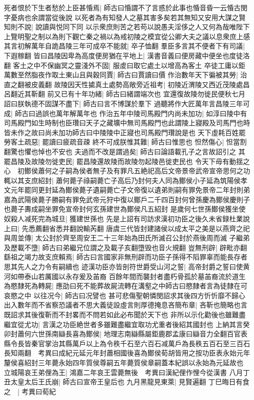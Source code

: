 死者恨於下生者愁於上臣甚惛焉|{
	師古曰惛謂不了言惑於此事也惛音昏一云惛古閔字憂病也余謂當從後說}
以死者為有知發人之墓其害多矣若其無知又安用大謀之賢知則不說|{
	說讀與悦同下同}
以示衆庶則苦之若苟以說愚夫淫侈之人又何為哉唯陛下上覽明聖之制以為則下觀亡秦之禍以為戒初陵之模宜從公卿大夫之議以息衆庶上感其言初解萬年自詭昌陵三年可成卒不能就|{
	卒子恤翻}
羣臣多言其不便者下有司議|{
	下遐稼翻}
皆曰昌陵因卑為高度便房猶在平地上|{
	漢書音義曰便房藏中便坐也度徒洛翻}
客土之中不保幽冥之靈淺外不固|{
	服䖍曰取它處土以增高為客土}
卒徒工庸以鉅萬數至然脂夜作取土東山且與穀同賈|{
	師古曰賈讀曰價}
作治數年天下徧被其勞|{
	治直之翻被皮義翻}
故陵因天性㨿真土處勢高敞旁近祖考|{
	初陵近渭陵又西近茂陵處昌呂翻近其靳翻}
前又已有十年功緒|{
	師古曰緒謂端次也}
宜還復故陵勿徙民便秋七月詔曰朕執德不固謀不盡下|{
	師古曰言不博謀於羣下}
過聽將作大匠萬年言昌陵三年可成|{
	師古曰過誤也萬年解萬年也}
作治五年中陵司馬殿門内尚未加功|{
	如淳曰陵中有司馬殿門如生時制也臣瓚曰天子之藏壙中無司馬殿門也此謂陵上寢殿及司馬門也時皆未作之故曰尚未加功師古曰中陵陵中正寢也司馬殿門瓚說是也}
天下虛耗百姓罷勞客土疏惡|{
	罷讀曰疲疏音疎}
終不可成朕惟其難|{
	師古曰惟思也}
怛然傷心|{
	怛當割翻驚也懼也悼也不安也}
夫過而不改是謂過矣|{
	師古曰論語載孔子之言故詔引之}
其罷昌陵及故陵勿徙吏民|{
	罷昌陵還故陵而故陵勿起陵邑徙吏民也}
令天下毋有動揺之心　初鄼侯蕭何之子嗣為侯者無子及有罪凡五絶祀高后文帝景帝武帝宣帝思何之功輒以其支庶紹封|{
	蕭何薨子祿嗣薨亡子高后乃封何夫人同為鄼侯小子延為筑陽侯孝文元年罷同更封延為鄼侯薨子遺嗣薨亡子文帝復以遺弟則嗣有罪免景帝二年封則弟嘉為武陽侯薨子勝嗣有罪免武帝元狩中復以鄼戶二千四百封何曾孫慶為鄼侯慶則子也薨子夀成嗣坐罪免宣帝封何玄孫建世為鄼侯凡五紹封}
是歲何七世孫鄼侯獲坐使奴殺人减死完為城旦|{
	獲建世孫也}
先是上詔有司訪求漢初功臣之後久未省録杜業說上曰|{
	先悉薦翻省悉井翻說輸芮翻}
唐虞三代皆封建諸侯以成太平之美是以燕齊之祀與周並傳|{
	太公封於齊至周安王二十三年始為田氏所滅召公封於燕後周而滅}
子繼弟及歷載不墮|{
	師古曰弟繼兄位謂之及載子亥翻墮毁也音火規翻}
豈無刑辟|{
	辟毗亦翻}
繇祖之竭力故支庶賴焉|{
	師古曰言國家非無刑辟而功臣子孫得不䧟罪辜而能長存者思其先人之力令有嗣續也}
迹漢功臣亦皆剖符世爵受山河之誓|{
	高帝封爵之誓曰使黄河如帶泰山若厲國以永存爰及苖裔}
百餘年間而襲封者盡朽骨孤於墓苖裔流於道生為愍隸死為轉屍|{
	應劭曰死不能葬故屍流轉在溝壑之中師古曰愍隸者言為徒隸在可哀愍之中}
以往况今|{
	師古曰况譬也}
甚可悲傷聖朝憐閔詔求其後四方忻忻靡不歸心出入數年而不省察恐議者不思大義徒設虛言則厚德掩息吝簡布章|{
	吝靳也簡略也言既詔求其後復靳而不封畧而不問若如此必布聞於天下也}
非所以示化勸後也雖難盡繼宜從尤功|{
	言漢之功臣絶世者多雖難盡繼宜取功尤重者後紹其國封也}
上納其言癸卯封蕭何六世孫南䜌長喜為鄼侯|{
	地理志南䜌縣屬鉅鹿郡孟康曰䜌音力全翻百官表縣令長皆秦官掌治其縣萬戶以上為令秩千石至六百石减萬戶為長秩五百石至三百石長知兩翻　考異曰成紀元延元年封蕭相國後喜為鄼侯荀胡皆用之按功臣表永始元年釐侯喜紹封三年薨永始四年質侯尊嗣五年薨質侯章嗣蓋本紀誤以永始為元延故也}
立城陽哀王弟俚為王|{
	鴻嘉二年哀王雲薨無後　考異曰漢紀俚作悝今從漢書}
八月丁丑太皇太后王氏崩|{
	師古曰宣帝王皇后也}
九月黑龍見東萊|{
	見賢遍翻}
丁巳晦日有食之　|{
	考異曰荀紀}


